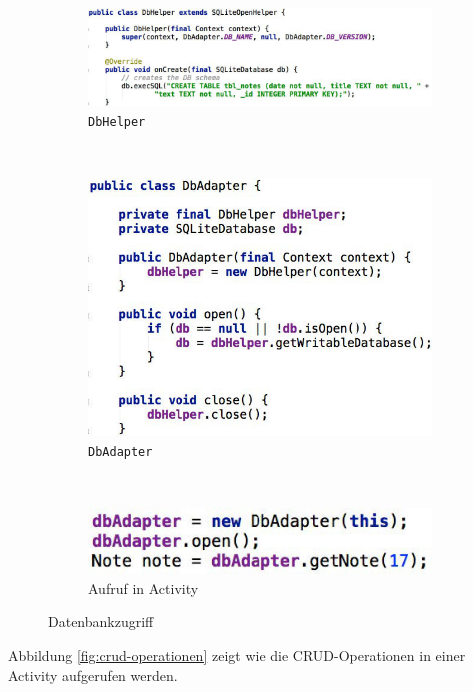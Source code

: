 \begin{figure}
	\centering
	\begin{subfigure}[b]{0.48\textwidth}
		\includegraphics[width=\textwidth]{fig/dbhelper}
		\caption{\texttt{DbHelper}}
	\end{subfigure}
	~
	\begin{subfigure}[b]{0.48\textwidth}
		\includegraphics[width=\textwidth]{fig/dbadapter}
		\caption{\texttt{DbAdapter}}
	\end{subfigure}
	~
	\begin{subfigure}[b]{0.48\textwidth}
		\includegraphics[width=\textwidth]{fig/dbadapter-activity}
		\caption{Aufruf in Activity}
	\end{subfigure}
	\caption{Datenbankzugriff}
	\label{fig:db-adaper-helper}
\end{figure}
Abbildung \ref{fig:crud-operationen} zeigt wie die CRUD-Operationen in einer Activity aufgerufen werden.
